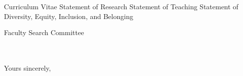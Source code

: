 



\addAttach%
{Curriculum Vitae}%
{Statement of Research}%
{Statement of Teaching}%
{Statement of Diversity, Equity, Inclusion, and Belonging}%

\def\appJobID{%
    \ifthenelse{\equal{\jobID}{}}{\unskip}{\unskip\textemdash Job \# \jobID{}}%
}
\def\toAddr{%
Faculty Search Committee \\ \appDept{} \\ \appSchool{} \\ \appAddr{}%
}

\begin{letter}{\toAddr{}}
    \opening{\myOpening{}}
    
    \collabCustom{}%
    
    \closing{Yours sincerely,}
    \encl{\listAttach{}}
\end{letter}
